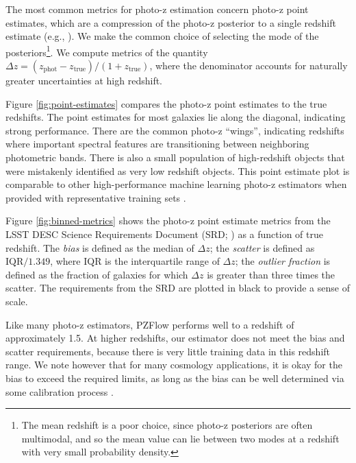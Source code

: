 \documentclass[twocolumn,twocolappendix,linenumbers]{aastex631}
\begin{document}
The most common metrics for photo-z estimation concern photo-z point estimates, which are a compression of the photo-z posterior to a single redshift estimate (e.g., \citealt{hildebrandt2010,sanchez2014}).
We make the common choice of selecting the mode of the posteriors\footnote{The mean redshift is a poor choice, since photo-z posteriors are often multimodal, and so the mean value can lie between two modes at a redshift with very small probability density.}.
We compute metrics of the quantity $\Delta z = (z_\text{phot} - z_\text{true}) / (1 + z_\text{true})$, where the denominator accounts for naturally greater uncertainties at high redshift.

Figure \ref{fig:point-estimates} compares the photo-z point estimates to the true redshifts.
The point estimates for most galaxies lie along the diagonal, indicating strong performance.
There are the common photo-z ``wings'', indicating redshifts where important spectral features are transitioning between neighboring photometric bands.
There is also a small population of high-redshift objects that were mistakenly identified as very low redshift objects.
This point estimate plot is comparable to other high-performance machine learning photo-z estimators when provided with representative training sets \citep{sanchez2014}.

Figure \ref{fig:binned-metrics} shows the photo-z point estimate metrics from the LSST DESC Science Requirements Document (SRD; \citealt{descSRD}) as a function of true redshift.
The \emph{bias} is defined as the median of $\Delta z$; the \emph{scatter} is defined as $\text{IQR} / 1.349$, where IQR is the interquartile range of $\Delta z$; the \emph{outlier fraction} is defined as the fraction of galaxies for which $\Delta z$ is greater than three times the scatter.
The requirements from the SRD are plotted in black to provide a sense of scale.

Like many photo-z estimators, PZFlow performs well to a redshift of approximately 1.5.
At higher redshifts, our estimator does not meet the bias and scatter requirements, because there is very little training data in this redshift range.
We note however that for many cosmology applications, it is okay for the bias to exceed the required limits, as long as the bias can be well determined via some calibration process \citep{newman2015}.
\end{document}
